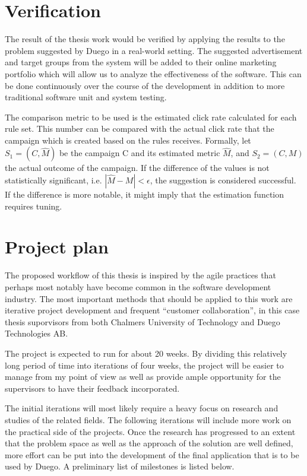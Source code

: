 \documentclass[a4paper]{article}
\begin{document}
\section{Verification}
The result of the thesis work would be verified by applying the results to the problem suggested by Duego in a real-world setting.
The suggested advertisement and target groups from the system will be added to their online marketing portfolio which will allow
us to analyze the effectiveness of the software. This can be done continuously over the course of the development in addition to
more traditional software unit and system testing.

The comparison metric to be used is the estimated click rate calculated for each rule set. This number can be compared with the
actual click rate that the campaign which is created based on the rules receives. Formally, let \(S_1 = (C, \hat{M})\) be the 
campaign C and its estimated metric \(\hat{M}\), and \(S_2 = (C, M)\) the actual outcome of the campaign. If the difference 
of the values is not statistically significant, i.e. \(|\hat{M} - M| < \epsilon\), the suggestion is considered successful. If the
difference is more notable, it might imply that the estimation function requires tuning.

\section{Project plan}
The proposed workflow of this thesis is inspired by the agile practices that perhaps most notably have become common in the
software development industry. The most important methods that should be applied to this work are iterative project development
and frequent ``customer collaboration'', in this case thesis suporvisors from both Chalmers University of Technology and Duego
Technologies AB.

The project is expected to run for about 20 weeks. By dividing this relatively long period of time into iterations of four weeks,
the project will be easier to manage from my point of view as well as provide ample opportunity for the supervisors to have their
feedback incorporated.

The initial iterations will most likely require a heavy focus on research and studies of the related fields. The following
iterations will include more work on the practical side of the projects. Once the research has progressed to an extent that the
problem space as well as the approach of the solution are well defined, more effort can be put into the development of the final
application that is to be used by Duego. A preliminary list of milestones is listed below.
\end{document}
